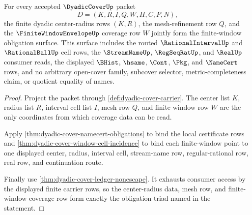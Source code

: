 \begin{theorem}
\label{thm:dyadic-cover-finite-window-obligation-triad}
For every accepted $\DyadicCoverUp$ packet
$$
D=(K,R,I,Q,W,H,C,P,N),
$$
the finite dyadic center-radius rows $(K,R)$, the mesh-refinement row $Q$, and
the $\FiniteWindowEnvelopeUp$ coverage row $W$ jointly form the finite-window
obligation surface. This surface includes the routed $\RationalIntervalUp$ and
$\RationalBallUp$ cell rows, the $\StreamNameUp$, $\RegSeqRatUp$, and
$\RealUp$ consumer reads, the displayed $\BHist$, $\hsame$, $\Cont$, $\Pkg$,
and $\NameCert$ rows, and no arbitrary open-cover family, subcover selector,
metric-completeness claim, or quotient equality of names.
\end{theorem}
\begin{proof}
Project the packet through \autoref{def:dyadic-cover-carrier}. The center list
$K$, radius list $R$, interval-cell list $I$, mesh row $Q$, and finite-window
row $W$ are the only coordinates from which coverage data can be read.

Apply \autoref{thm:dyadic-cover-namecert-obligations} to bind the local
certificate rows and \autoref{thm:dyadic-cover-window-cell-incidence} to bind
each finite-window point to one displayed center, radius, interval cell,
stream-name row, regular-rational row, real row, and continuation route.

Finally use \autoref{thm:dyadic-cover-ledger-nonescape}. It exhausts consumer
access by the displayed finite carrier rows, so the center-radius data, mesh
row, and finite-window coverage row form exactly the obligation triad named in
the statement.
\end{proof}

